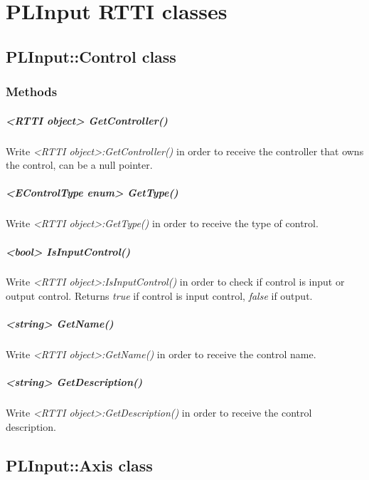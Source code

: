 \chapter{PLInput RTTI classes}




\section{PLInput::Control class}


\subsection{Methods}

\paragraph{<RTTI object> GetController()}
Write \emph{<RTTI object>:GetController()} in order to receive the controller that owns the control, can be a null pointer.

\paragraph{<EControlType enum> GetType()}
Write \emph{<RTTI object>:GetType()} in order to receive the type of control.

\paragraph{<bool> IsInputControl()}
Write \emph{<RTTI object>:IsInputControl()} in order to check if control is input or output control. Returns \emph{true} if control is input control, \emph{false} if output.

\paragraph{<string> GetName()}
Write \emph{<RTTI object>:GetName()} in order to receive the control name.

\paragraph{<string> GetDescription()}
Write \emph{<RTTI object>:GetDescription()} in order to receive the control description.




\section{PLInput::Axis class}


